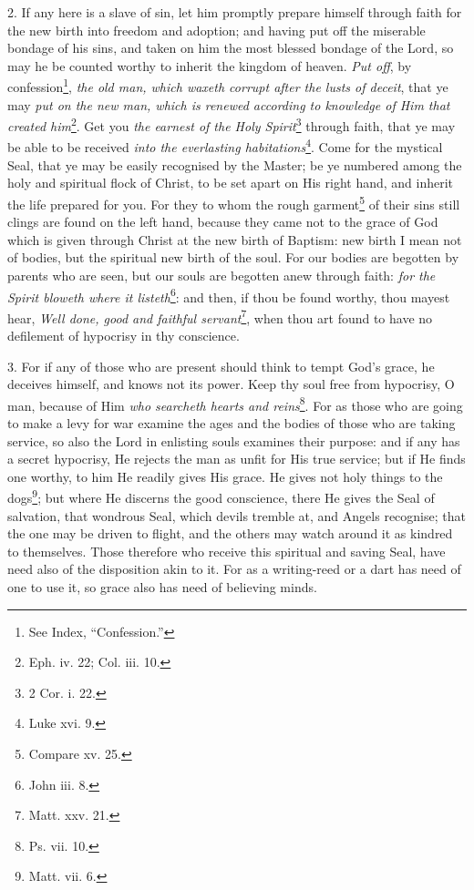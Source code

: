 2. If any here is a slave of sin, let him promptly prepare himself through faith for the new birth into freedom and adoption; and having put off the miserable bondage of his sins, and taken on him the most blessed bondage of the Lord, so may he be counted worthy to inherit the kingdom of heaven. \emph{Put off}, by confession\footnote{See Index, “Confession.”}, \emph{the old man, which waxeth corrupt after the lusts of deceit}, that ye may \emph{put on the new man, which is renewed according to knowledge of Him that created him}\footnote{Eph. iv. 22; Col. iii. 10.}. Get you \emph{the earnest of the Holy Spirit}\footnote{2 Cor. i. 22.} through faith, that ye may be able to be received \emph{into the everlasting habitations}\footnote{Luke xvi. 9.}. Come for the mystical Seal, that ye may be easily recognised by the Master; be ye numbered among the holy and spiritual flock of Christ, to be set apart on His right hand, and inherit the life prepared for you. For they to whom the rough garment\footnote{Compare xv. 25.} of their sins still clings are found on the left hand, because they came not to the grace of God which is given through Christ at the new birth of Baptism: new birth I mean not of bodies, but the spiritual new birth of the soul. For our bodies are begotten by parents who are seen, but our souls are begotten anew through faith: \emph{for the Spirit bloweth where it listeth}\footnote{John iii. 8.}: and then, if thou be found worthy, thou mayest hear, \emph{Well done, good and faithful servant}\footnote{Matt. xxv. 21.}, when thou art found to have no defilement of hypocrisy in thy conscience.

3. For if any of those who are present should think to tempt God’s grace, he deceives himself, and knows not its power. Keep thy soul free from hypocrisy, O man, because of Him \emph{who searcheth hearts and reins}\footnote{Ps. vii. 10.}. For as those who are going to make a levy for war examine the ages and the bodies of those who are taking service, so also the Lord in enlisting souls examines their purpose: and if any has a secret hypocrisy, He rejects the man as unfit for His true service; but if He finds one worthy, to him He readily gives His grace. He gives not holy things to the dogs\footnote{Matt. vii. 6.}; but where He discerns the good conscience, there He gives the Seal of salvation, that wondrous Seal, which devils tremble at, and Angels recognise; that the one may be driven to flight, and the others may watch around it as kindred to themselves. Those therefore who receive this spiritual and saving Seal, have need also of the disposition akin to it. For as a writing-reed or a dart has need of one to use it, so grace also has need of believing minds.

